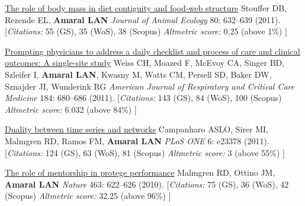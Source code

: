 \NumberedItem{\makebox[0.8cm][r]{[94]}}
\href{/people/amaral/role-body-mass-diet-contiguity-and-food-web-structure}
{The role of body mass in diet contiguity and food-web structure}
\newline
Stouffer DB, Rezende EL, {\textbf{Amaral LAN}}
\newline
\textit{Journal of  Animal Ecology}
    80:
632--639 (2011).
    \newline
    \hfill [{\em{Citations:}} 55 (GS),
    35 (WoS), 38 (Scopus)
        {\hspace*{1cm} \em{Altmetric score:}}  0.25 (above 1\%)
    ]
\newline
\Gap
~
\Gap

\NumberedItem{\makebox[0.8cm][r]{[93]}}
\href{/people/amaral/prompting-physicians-address-daily-checklist-and-process-care-and-clinical-outcomes-single-site-study}
{Prompting physicians to address a daily checklist and process of care and clinical outcomes: A single-site study}
\newline
Weiss CH, Moazed F, McEvoy CA, Singer BD, Szleifer I, {\textbf{Amaral LAN}}, Kwasny M, Watts CM, Persell SD, Baker DW, Sznajder JI, Wunderink RG
\newline
\textit{American Journal of Respiratory and Critical Care Medicine}
    184:
680--686 (2011).
    \newline
    \hfill [{\em{Citations:}} 143 (GS),
    84 (WoS), 100 (Scopus)
        {\hspace*{1cm} \em{Altmetric score:}}  6.032 (above 84\%)
    ]
\newline
\Gap
~
\Gap

\NumberedItem{\makebox[0.8cm][r]{[92]}}
\href{/people/amaral/duality-between-time-series-and-networks}
{Duality between time series and networks}
\newline
Campanharo ASLO, Sirer MI, Malmgren RD, Ramos FM, {\textbf{Amaral LAN}}
\newline
\textit{PLoS ONE}
    6:
e23378 (2011).
    \newline
    \hfill [{\em{Citations:}} 124 (GS),
    63 (WoS), 81 (Scopus)
        {\hspace*{1cm} \em{Altmetric score:}}  3 (above 55\%)
    ]
\newline
\Gap
~
\Gap

\NumberedItem{\makebox[0.8cm][r]{[91]}}
\href{/people/amaral/role-mentorship-protege-performance}
{The role of mentorship in protege performance}
\newline
Malmgren RD, Ottino JM, {\textbf{Amaral LAN}}
\newline
\textit{Nature}
    463:
622--626 (2010).
    \newline
    \hfill [{\em{Citations:}} 75 (GS),
    36 (WoS), 42 (Scopus)
        {\hspace*{1cm} \em{Altmetric score:}}  32.25 (above 96\%)
    ]
\newline
\Gap
~
\Gap

